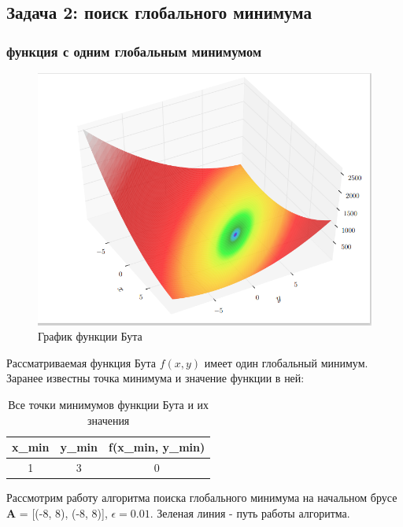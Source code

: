 \subsection{Задача 2: поиск глобального минимума}

\subsubsection{функция с одним глобальным минимумом}

\begin{figure}[H]
		\centering
			\includegraphics[scale=0.5]{task2/resources/Figure_1.png}
		\caption{График функции Бута}
		\label{w_pert}
	\end{figure}

Рассматриваемая функция Бута $f(x, y)$ имеет один глобальный минимум. Заранее известны точка минимума и значение функции в ней:

\begin{table}[H]
	\centering
	\begin{tabular}{| c | c | c |}
		\hline
		    x_{min} & y_{min} & f(x_{min}, y_{min}) \\
		\hline
		    1 & 3 & 0 \\
   		\hline
	\end{tabular}
	\caption{Все точки минимумов функции Бута и их значения}
\end{table}

Рассмотрим работу алгоритма поиска глобального минимума на начальном брусе \textbf{A} = [(-8, 8), (-8, 8)], $\epsilon = 0.01$. Зеленая линия - путь работы алгоритма.

